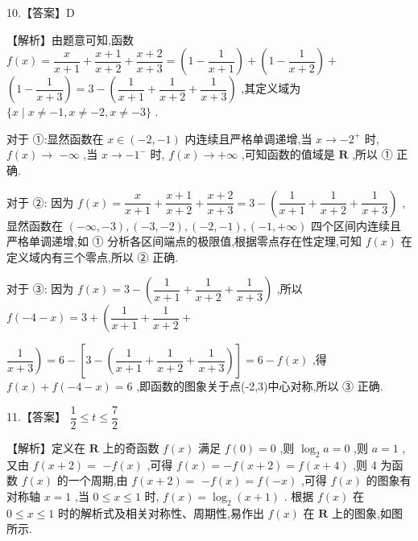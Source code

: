 \documentclass[10pt]{article}
\begin{document}
10.【答案】D

【解析】由题意可知,函数 $f\left( x\right)  = \dfrac{x}{x + 1} + \dfrac{x + 1}{x + 2} + \dfrac{x + 2}{x + 3} = \left( {1 - \dfrac{1}{x + 1}}\right)  + \left( {1 - \dfrac{1}{x + 2}}\right)  +$  $\left( {1 - \dfrac{1}{x + 3}}\right)  = 3 - \left( {\dfrac{1}{x + 1} + \dfrac{1}{x + 2} + \dfrac{1}{x + 3}}\right)$ ,其定义域为 $\{ x \mid  x \neq   - 1,x \neq   - 2,x \neq   - 3\}$ .

对于 ①:显然函数在 $x \in  \left( {-2, - 1}\right)$ 内连续且严格单调递增,当 $x \rightarrow   - {2}^{ + }$ 时, $f\left( x\right)  \rightarrow$  $- \infty$ ,当 $x \rightarrow   - {1}^{ - }$ 时, $f\left( x\right)  \rightarrow   + \infty$ ,可知函数的值域是 $\mathbf{R}$ ,所以 ① 正确.

对于 ②: 因为 $f\left( x\right)  = \dfrac{x}{x + 1} + \dfrac{x + 1}{x + 2} + \dfrac{x + 2}{x + 3} = 3 - \left( {\dfrac{1}{x + 1} + \dfrac{1}{x + 2} + \dfrac{1}{x + 3}}\right)$ ,显然函数在 $\left( {-\infty , - 3}\right) ,\left( {-3, - 2}\right) ,\left( {-2, - 1}\right) ,\left( {-1, + \infty }\right)$ 四个区间内连续且严格单调递增,如 ① 分析各区间端点的极限值,根据零点存在性定理,可知 $f\left( x\right)$ 在定义域内有三个零点,所以 ② 正确.

对于 ③: 因为 $f\left( x\right)  = 3 - \left( {\dfrac{1}{x + 1} + \dfrac{1}{x + 2} + \dfrac{1}{x + 3}}\right)$ ,所以 $f\left( {-4 - x}\right)  = 3 + \left( {\dfrac{1}{x + 1} + \dfrac{1}{x + 2} + }\right.$

$\left. \dfrac{1}{x + 3}\right)  = 6 - \left\lbrack  {3 - \left( {\dfrac{1}{x + 1} + \dfrac{1}{x + 2} + \dfrac{1}{x + 3}}\right) }\right\rbrack   = 6 - f\left( x\right)$ ,得 $f\left( x\right)  + f\left( {-4 - x}\right)  = 6$ ,即函数的图象关于点(-2,3)中心对称,所以 ③ 正确.

11.【答案】 $\dfrac{1}{2} \leq  t \leq  \dfrac{7}{2}$

【解析】定义在 $\mathbf{R}$ 上的奇函数 $f\left( x\right)$ 满足 $f\left( 0\right)  = 0$ ,则 ${\log }_{2}a = 0$ ,则 $a = 1$ ,又由 $f\left( {x + 2}\right)  =$  $- f\left( x\right)$ ,可得 $f\left( x\right)  =  - f\left( {x + 2}\right)  = f\left( {x + 4}\right)$ ,则 4 为函数 $f\left( x\right)$ 的一个周期,由 $f\left( {x + 2}\right)  =$  $- f\left( x\right)  = f\left( {-x}\right)$ ,可得 $f\left( x\right)$ 的图象有对称轴 $x = 1$ ,当 $0 \leq  x \leq  1$ 时, $f\left( x\right)  = {\log }_{2}\left( {x + 1}\right)$ . 根据 $f\left( x\right)$ 在 $0 \leq  x \leq  1$ 时的解析式及相关对称性、周期性,易作出 $f\left( x\right)$ 在 $\mathbf{R}$ 上的图象,如图所示.
\end{document}
